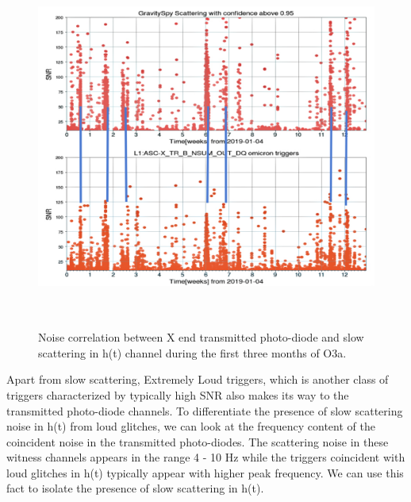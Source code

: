 \documentclass[12pt]{iopart}
\begin{document}
\begin{figure}[h]
  \centering
         \includegraphics[width = 14cm,height=12cm]{hxtrb_corr1.jpg}
         \caption{Noise correlation between X end transmitted photo-diode and slow scattering in h(t) channel during the first three months of O3a.}
    \label{fig:transetmx}
\end{figure}

Apart from slow scattering, Extremely Loud triggers, which is another class of triggers characterized by typically high SNR also makes its way to the transmitted photo-diode channels. To differentiate the presence of slow scattering noise in h(t) from loud glitches, we can look at the frequency content of the coincident noise in the transmitted photo-diodes. The scattering noise in these witness channels appears in the range  4 - 10 Hz while the triggers coincident with loud glitches in h(t) typically appear with higher peak frequency. We can use this fact to isolate the presence of slow scattering in h(t).
\end{document}
